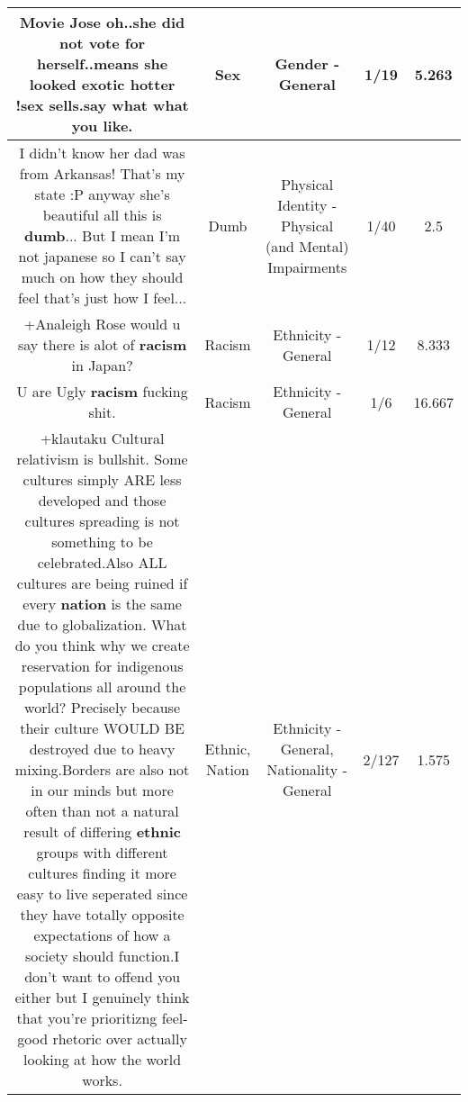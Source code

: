\documentclass[11pt]{article}
\newlength\mylength
\begin{document}
\begin{center}
\begin{longtable}{|C{.65\mylength}|C{.30\mylength}|C{.12\mylength}|C{.12\mylength}|C{.12\mylength}|}
  \small Movie Jose oh..she did not vote for herself..means she looked exotic hotter !\textbf{sex} sells.say what what you like.\normalsize   & Sex & Gender - General & 1/19 & 5.263 \\  \hline
  \small I didn't know her dad was from Arkansas! That's my state :P anyway she's beautiful all this is \textbf{dumb}... But I mean I'm not japanese so I can't say much on how they should feel that's just how I feel...\normalsize   & Dumb & Physical Identity - Physical (and Mental) Impairments & 1/40 & 2.5 \\  \hline
  \small +Analeigh Rose would u say there is alot of \textbf{racism} in Japan?\normalsize   & Racism & Ethnicity - General & 1/12 & 8.333 \\  \hline
  \small U are Ugly \textbf{racism} fucking shit.\normalsize   & Racism & Ethnicity - General & 1/6 & 16.667 \\  \hline
  \small +klautaku Cultural relativism is bullshit. Some cultures simply ARE less developed and those cultures spreading is not something to be celebrated.Also ALL cultures are being ruined if every \textbf{nation} is the same due to globalization. What do you think why we create reservation for indigenous populations all around the world? Precisely because their culture WOULD BE destroyed due to heavy mixing.Borders are also not in our minds but more often than not a natural result of differing \textbf{ethnic} groups with different cultures finding it more easy to live seperated since they have totally opposite expectations of how a society should function.I don't want to offend you either but I genuinely think that you're prioritizng feel-good rhetoric over actually looking at how the world works.\normalsize   & Ethnic, Nation & Ethnicity - General, Nationality - General & 2/127 & 1.575 \\  \hline

\end{longtable}
\end{center}
\end{document}
